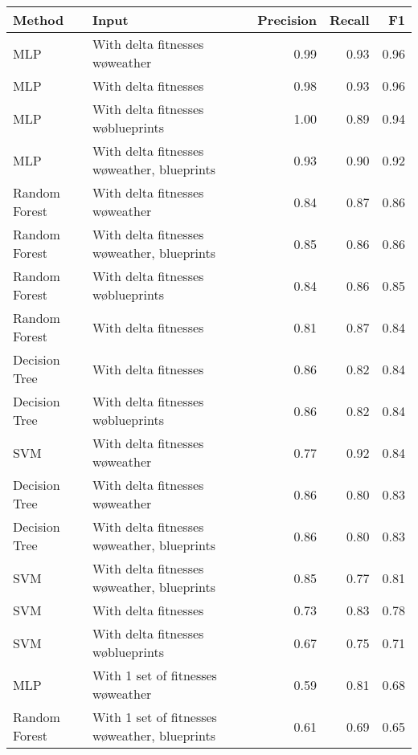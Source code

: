 \begin{tabular}{llrrr}
\toprule
        Method &                                           Input &  Precision &  Recall &   F1 \\
\midrule
           MLP &                With delta fitnesses w\o weather &       0.99 &    0.93 & 0.96 \\
           MLP &                            With delta fitnesses &       0.98 &    0.93 & 0.96 \\
           MLP &             With delta fitnesses w\o blueprints &       1.00 &    0.89 & 0.94 \\
           MLP &    With delta fitnesses w\o weather, blueprints &       0.93 &    0.90 & 0.92 \\
 Random Forest &                With delta fitnesses w\o weather &       0.84 &    0.87 & 0.86 \\
 Random Forest &    With delta fitnesses w\o weather, blueprints &       0.85 &    0.86 & 0.86 \\
 Random Forest &             With delta fitnesses w\o blueprints &       0.84 &    0.86 & 0.85 \\
 Random Forest &                            With delta fitnesses &       0.81 &    0.87 & 0.84 \\
 Decision Tree &                            With delta fitnesses &       0.86 &    0.82 & 0.84 \\
 Decision Tree &             With delta fitnesses w\o blueprints &       0.86 &    0.82 & 0.84 \\
           SVM &                With delta fitnesses w\o weather &       0.77 &    0.92 & 0.84 \\
 Decision Tree &                With delta fitnesses w\o weather &       0.86 &    0.80 & 0.83 \\
 Decision Tree &    With delta fitnesses w\o weather, blueprints &       0.86 &    0.80 & 0.83 \\
           SVM &    With delta fitnesses w\o weather, blueprints &       0.85 &    0.77 & 0.81 \\
           SVM &                            With delta fitnesses &       0.73 &    0.83 & 0.78 \\
           SVM &             With delta fitnesses w\o blueprints &       0.67 &    0.75 & 0.71 \\
           MLP &             With 1 set of fitnesses w\o weather &       0.59 &    0.81 & 0.68 \\
 Random Forest & With 1 set of fitnesses w\o weather, blueprints &       0.61 &    0.69 & 0.65 \\

\end{tabular}
